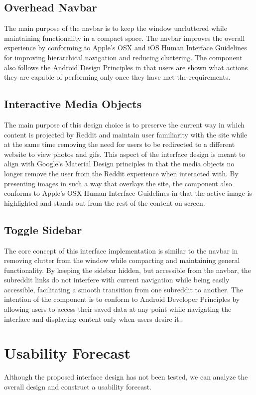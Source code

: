 \documentclass{article}
\begin{document}
\subsection{Overhead Navbar} The main purpose of the navbar is to keep the window uncluttered while maintaining functionality in a compact space. The navbar improves the overall experience by conforming to Apple's OSX and iOS Human Interface Guidelines for improving hierarchical navigation and reducing cluttering\cite{OSX, iOS}. The component also follows the Android Design Principles in that users are shown what actions they are capable of performing only once they have met the requirements\cite{Android}.

\subsection{Interactive Media Objects} The main purpose of this design choice is to preserve the current way in which content is projected by Reddit and maintain user familiarity with the site while at the same time removing the need for users to be redirected to a different website to view photos and gifs. This aspect of the interface design is meant to align with Google's Material Design principles in that the media objects no longer remove the user from the Reddit experience when interacted with\cite{Google}. By presenting images in such a way that overlays the site, the component also conforms to Apple's OSX Human Interface Guidelines in that the active image is highlighted and stands out from the rest of the content on screen\cite{OSX}.

\subsection{Toggle Sidebar} The core concept of this interface implementation is similar to the navbar in removing clutter from the window while compacting and maintaining general functionality. By keeping the sidebar hidden, but accessible from the navbar, the subreddit links do not interfere with current navigation while being easily accessible, facilitating a smooth transition from one subreddit to another. The intention of the component is to conform to Android Developer Principles by allowing users to access their saved data at any point while navigating the interface and displaying content only when users desire it.\cite{Android}.

\section{Usability Forecast} Although the proposed interface design has not been tested, we can analyze the overall design and construct a usability forecast.
\end{document}

